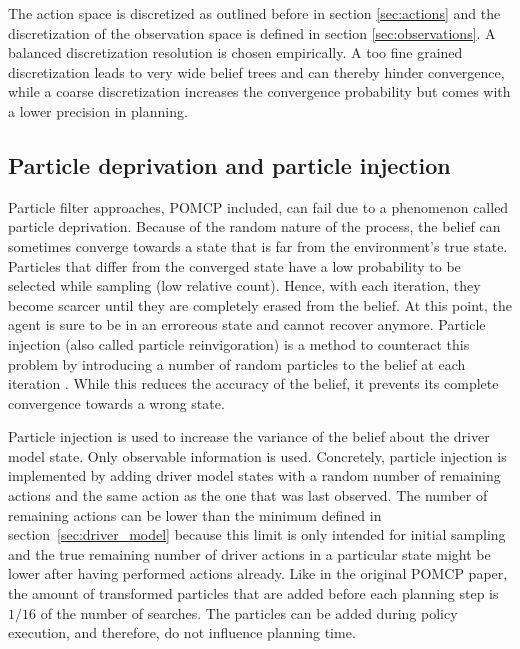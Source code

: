 The action space is discretized as outlined before in section \ref{sec:actions} and the discretization of the observation space is defined in section \ref{sec:observations}. A balanced discretization resolution is chosen empirically. A too fine grained discretization leads to very wide belief trees and can thereby hinder convergence, while a coarse discretization increases the convergence probability but comes with a lower precision in planning.

\subsection{Particle deprivation and particle injection}
\label{sec:particle_deprivation}

Particle filter approaches, POMCP included, can fail due to a phenomenon called particle deprivation. Because of the random nature of the process, the belief can sometimes converge towards a state that is far from the environment's true state. Particles that differ from the converged state have a low probability to be selected while sampling (low relative count). Hence, with each iteration, they become scarcer until they are completely erased from the belief. At this point, the agent is sure to be in an erroreous state and cannot recover anymore. Particle injection (also called particle reinvigoration) is a method to counteract this problem by introducing a number of random particles to the belief at each iteration \parencite{decision_making_book}. While this reduces the accuracy of the belief, it prevents its complete convergence towards a wrong state. 

Particle injection is used to increase the variance of the belief about the driver model state. Only observable information is used. Concretely, particle injection is implemented by adding driver model states with a random number of remaining actions and the same action as the one that was last observed. The number of remaining actions can be lower than the minimum defined in section~\ref{sec:driver_model} because this limit is only intended for initial sampling and the true remaining number of driver actions in a particular state might be lower after having performed actions already. Like in the original POMCP paper, the amount of transformed particles that are added before each planning step is $1/16$ of the number of searches. The particles can be added during policy execution, and therefore, do not influence planning time.



